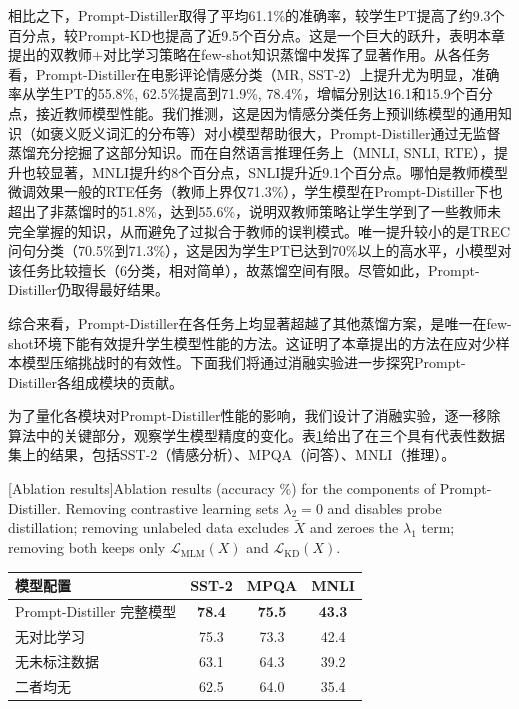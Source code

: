 \documentclass[../main.tex]{subfiles}
\begin{document}
相比之下，Prompt-Distiller取得了平均61.1\%的准确率，较学生PT提高了约9.3个百分点，较Prompt-KD也提高了近9.5个百分点。这是一个巨大的跃升，表明本章提出的双教师+对比学习策略在few-shot知识蒸馏中发挥了显著作用。从各任务看，Prompt-Distiller在电影评论情感分类（MR, SST-2）上提升尤为明显，准确率从学生PT的55.8\%, 62.5\%提高到71.9\%, 78.4\%，增幅分别达16.1和15.9个百分点，接近教师模型性能。我们推测，这是因为情感分类任务上预训练模型的通用知识（如褒义贬义词汇的分布等）对小模型帮助很大，Prompt-Distiller通过无监督蒸馏充分挖掘了这部分知识。而在自然语言推理任务上（MNLI, SNLI, RTE），提升也较显著，MNLI提升约8个百分点，SNLI提升近9.1个百分点。哪怕是教师模型微调效果一般的RTE任务（教师上界仅71.3\%），学生模型在Prompt-Distiller下也超出了非蒸馏时的51.8\%，达到55.6\%，说明双教师策略让学生学到了一些教师未完全掌握的知识，从而避免了过拟合于教师的误判模式。唯一提升较小的是TREC问句分类（70.5\%到71.3\%），这是因为学生PT已达到70\%以上的高水平，小模型对该任务比较擅长（6分类，相对简单），故蒸馏空间有限。尽管如此，Prompt-Distiller仍取得最好结果。

综合来看，Prompt-Distiller在各任务上均显著超越了其他蒸馏方案，是唯一在few-shot环境下能有效提升学生模型性能的方法。这证明了本章提出的方法在应对少样本模型压缩挑战时的有效性。下面我们将通过消融实验进一步探究Prompt-Distiller各组成模块的贡献。

\label{sec:ch3-5-3-ablation-analysis}
为了量化各模块对Prompt-Distiller性能的影响，我们设计了消融实验，逐一移除算法中的关键部分，观察学生模型精度的变化。表\ref{tab:ablation-results}给出了在三个具有代表性数据集上的结果，包括SST-2（情感分析）、MPQA（问答）、MNLI（推理）。

\begin{table}[htbp]
	\centering
	[Ablation results]{Ablation results (accuracy \%) for the components of Prompt-Distiller. Removing contrastive learning sets $\lambda_2=0$ and disables probe distillation; removing unlabeled data excludes $\tilde{X}$ and zeroes the $\lambda_1$ term; removing both keeps only $\mathcal{L}_{\text{MLM}}(X)$ and $\mathcal{L}_{\text{KD}}(X)$.}
	\label{tab:ablation-results}
	\small\begin{tabular}{l|ccc}
		\toprule[1pt]
		\textbf{模型配置}         & \textbf{SST-2} & \textbf{MPQA} & \textbf{MNLI} \\
		\midrule[0.5pt]
		Prompt-Distiller 完整模型 & \textbf{78.4}  & \textbf{75.5} & \textbf{43.3} \\
		\midrule[0.5pt]
		无对比学习                 & 75.3           & 73.3          & 42.4          \\
		无未标注数据                & 63.1           & 64.3          & 39.2          \\
		二者均无                  & 62.5           & 64.0          & 35.4          \\
		\bottomrule[1pt]
	\end{tabular}
\end{table}
\end{document}
